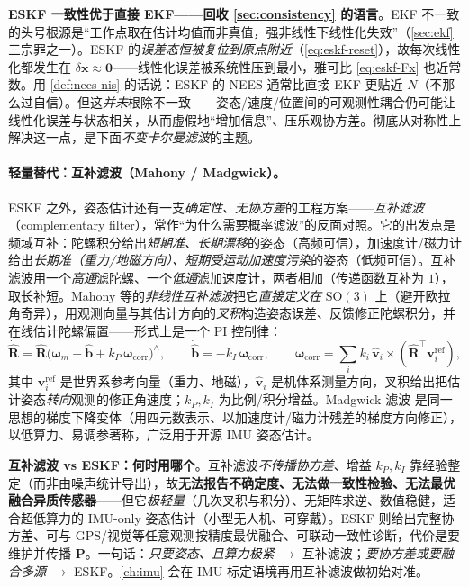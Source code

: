 \begin{insight}
\textbf{ESKF 一致性优于直接 EKF——回收 \cref{sec:consistency} 的语言}。EKF 不一致的头号根源是“工作点取在估计均值而非真值，强非线性下线性化失效”（\cref{sec:ekf} 三宗罪之一）。ESKF 的\emph{误差态恒被复位到原点附近}（\cref{eq:eskf-reset}），故每次线性化都发生在 $\delta\mathbf{x}\approx\mathbf{0}$——线性化误差被系统性压到最小，雅可比 \cref{eq:eskf-Fx} 也近常数。用 \cref{def:nees-nis} 的话说：ESKF 的 NEES 通常比直接 EKF 更贴近 $N$（不那么过自信）。但这\emph{并未}根除不一致——姿态/速度/位置间的可观测性耦合仍可能让线性化误差与状态相关，从而虚假地“增加信息”、压乐观协方差。彻底从对称性上解决这一点，是下面\emph{不变卡尔曼滤波}的主题。
\end{insight}

\paragraph{轻量替代：互补滤波（Mahony / Madgwick）。}
ESKF 之外，姿态估计还有一支\emph{确定性、无协方差}的工程方案——\emph{互补滤波}（complementary filter），常作“为什么需要概率滤波”的反面对照。它的出发点是频域互补：陀螺积分给出\emph{短期准、长期漂移}的姿态（高频可信），加速度计/磁力计给出\emph{长期准（重力/地磁方向）、短期受运动加速度污染}的姿态（低频可信）。互补滤波用一个\emph{高通}滤陀螺、一个\emph{低通}滤加速度计，两者相加（传递函数互补为 $1$），取长补短\cite{mahony2008nonlinear}。Mahony 等的\emph{非线性互补滤波}把它\emph{直接定义在} $\mathrm{SO}(3)$ 上（避开欧拉角奇异），用观测向量与其估计方向的\emph{叉积}构造姿态误差、反馈修正陀螺积分，并在线估计陀螺偏置——形式上是一个 PI 控制律：
\begin{equation}
  \dot{\hat{\mathbf{R}}}=\hat{\mathbf{R}}\big(\boldsymbol{\omega}_m-\hat{\mathbf{b}}+k_P\,\boldsymbol{\omega}_{\text{corr}}\big)^\wedge,\qquad
  \dot{\hat{\mathbf{b}}}=-k_I\,\boldsymbol{\omega}_{\text{corr}},\qquad
  \boldsymbol{\omega}_{\text{corr}}=\textstyle\sum_i k_i\,\hat{\mathbf{v}}_i\times(\hat{\mathbf{R}}^\top\mathbf{v}_i^{\text{ref}}),
  \label{eq:complementary-filter}
\end{equation}
其中 $\mathbf{v}_i^{\text{ref}}$ 是世界系参考向量（重力、地磁），$\hat{\mathbf{v}}_i$ 是机体系测量方向，叉积给出把估计姿态\emph{转向}观测的修正角速度；$k_P,k_I$ 为比例/积分增益。Madgwick 滤波\cite{madgwick2011estimation} 是同一思想的梯度下降变体（用四元数表示、以加速度计/磁力计残差的梯度方向修正），以低算力、易调参著称，广泛用于开源 IMU 姿态估计。

\begin{insight}
\textbf{互补滤波 vs ESKF：何时用哪个}。互补滤波\emph{不传播协方差}、增益 $k_P,k_I$ 靠经验整定（而非由噪声统计导出），故\textbf{无法报告不确定度、无法做一致性检验、无法最优融合异质传感器}——但它\emph{极轻量}（几次叉积与积分）、无矩阵求逆、数值稳健，适合超低算力的 IMU-only 姿态估计（小型无人机、可穿戴）。ESKF 则给出完整协方差、可与 GPS/视觉等任意观测按精度最优融合、可联动一致性诊断，代价是要维护并传播 $\mathbf{P}$。一句话：\emph{只要姿态、且算力极紧} $\to$ 互补滤波；\emph{要协方差或要融合多源} $\to$ ESKF。\cref{ch:imu} 会在 IMU 标定语境再用互补滤波做初始对准。
\end{insight}

